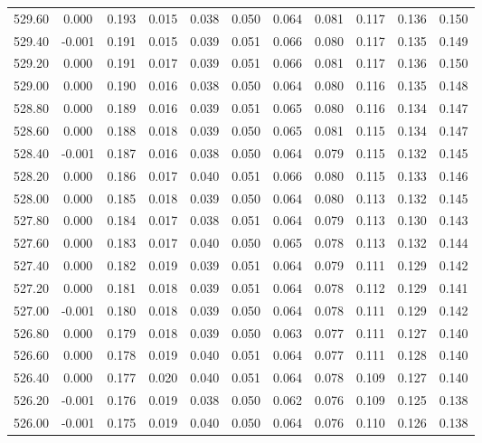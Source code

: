 \begin{longtable}{cccccccccc}
    529.60 &  0.000 &  0.193 &  0.015 &  0.038 &  0.050 &  0.064 &  0.081 &  0.117 &  0.136 &  0.150 \\
    529.40 & -0.001 &  0.191 &  0.015 &  0.039 &  0.051 &  0.066 &  0.080 &  0.117 &  0.135 &  0.149 \\
    529.20 &  0.000 &  0.191 &  0.017 &  0.039 &  0.051 &  0.066 &  0.081 &  0.117 &  0.136 &  0.150 \\
    529.00 &  0.000 &  0.190 &  0.016 &  0.038 &  0.050 &  0.064 &  0.080 &  0.116 &  0.135 &  0.148 \\
    528.80 &  0.000 &  0.189 &  0.016 &  0.039 &  0.051 &  0.065 &  0.080 &  0.116 &  0.134 &  0.147 \\
    528.60 &  0.000 &  0.188 &  0.018 &  0.039 &  0.050 &  0.065 &  0.081 &  0.115 &  0.134 &  0.147 \\
    528.40 & -0.001 &  0.187 &  0.016 &  0.038 &  0.050 &  0.064 &  0.079 &  0.115 &  0.132 &  0.145 \\
    528.20 &  0.000 &  0.186 &  0.017 &  0.040 &  0.051 &  0.066 &  0.080 &  0.115 &  0.133 &  0.146 \\
    528.00 &  0.000 &  0.185 &  0.018 &  0.039 &  0.050 &  0.064 &  0.080 &  0.113 &  0.132 &  0.145 \\
    527.80 &  0.000 &  0.184 &  0.017 &  0.038 &  0.051 &  0.064 &  0.079 &  0.113 &  0.130 &  0.143 \\
    527.60 &  0.000 &  0.183 &  0.017 &  0.040 &  0.050 &  0.065 &  0.078 &  0.113 &  0.132 &  0.144 \\
    527.40 &  0.000 &  0.182 &  0.019 &  0.039 &  0.051 &  0.064 &  0.079 &  0.111 &  0.129 &  0.142 \\
    527.20 &  0.000 &  0.181 &  0.018 &  0.039 &  0.051 &  0.064 &  0.078 &  0.112 &  0.129 &  0.141 \\
    527.00 & -0.001 &  0.180 &  0.018 &  0.039 &  0.050 &  0.064 &  0.078 &  0.111 &  0.129 &  0.142 \\
    526.80 &  0.000 &  0.179 &  0.018 &  0.039 &  0.050 &  0.063 &  0.077 &  0.111 &  0.127 &  0.140 \\
    526.60 &  0.000 &  0.178 &  0.019 &  0.040 &  0.051 &  0.064 &  0.077 &  0.111 &  0.128 &  0.140 \\
    526.40 &  0.000 &  0.177 &  0.020 &  0.040 &  0.051 &  0.064 &  0.078 &  0.109 &  0.127 &  0.140 \\
    526.20 & -0.001 &  0.176 &  0.019 &  0.038 &  0.050 &  0.062 &  0.076 &  0.109 &  0.125 &  0.138 \\
    526.00 & -0.001 &  0.175 &  0.019 &  0.040 &  0.050 &  0.064 &  0.076 &  0.110 &  0.126 &  0.138 \\

\end{longtable}
